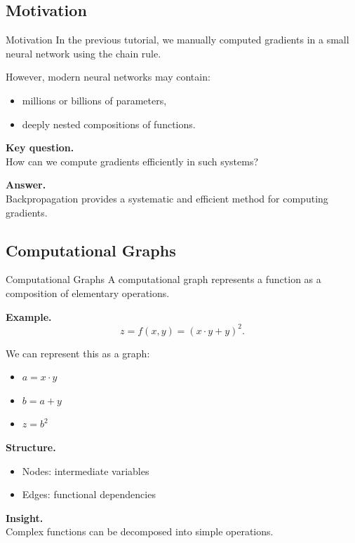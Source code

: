 \documentclass[aspectratio=169,11pt]{beamer}
\begin{document}
\subsection{Motivation}
\begin{frame}[t,allowframebreaks]{Motivation}
\small
In the previous tutorial, we manually computed gradients in a small neural network using the chain rule.

However, modern neural networks may contain:
\begin{itemize}
    \item millions or billions of parameters,
    \item deeply nested compositions of functions.
\end{itemize}

\textbf{Key question.}\\ How can we compute gradients efficiently in such systems?

\textbf{Answer.}\\ Backpropagation provides a systematic and efficient method for computing gradients.
\end{frame}

\subsection{Computational Graphs}
\begin{frame}[t,allowframebreaks]{Computational Graphs}
\small
A computational graph represents a function as a composition of elementary operations.

\textbf{Example.}\\ \[
z = f(x,y) = (x \cdot y + y)^2.
\]

We can represent this as a graph:
\begin{itemize}
    \item $a = x \cdot y$
    \item $b = a + y$
    \item $z = b^2$
\end{itemize}

\textbf{Structure.}\\ \begin{itemize}
    \item Nodes: intermediate variables
    \item Edges: functional dependencies
\end{itemize}

\textbf{Insight.}\\ Complex functions can be decomposed into simple operations.
\end{frame}
\end{document}

